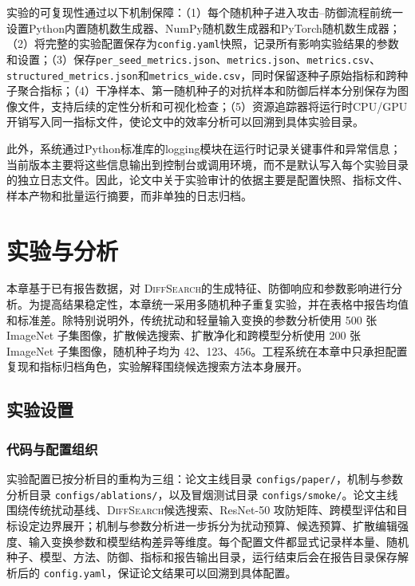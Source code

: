 \documentclass[type=bachelor,oneside]{fduthesis}
\newcommand{\methodname}{\textsc{DiffSearch}}
\begin{document}
实验的可复现性通过以下机制保障：（1）每个随机种子进入攻击--防御流程前统一设置Python内置随机数生成器、NumPy随机数生成器和PyTorch随机数生成器；（2）将完整的实验配置保存为\texttt{config.yaml}快照，记录所有影响实验结果的参数和设置；（3）保存\texttt{per\_seed\_metrics.json}、\texttt{metrics.json}、\texttt{metrics.csv}、\texttt{structured\_metrics.json}和\texttt{metrics\_wide.csv}，同时保留逐种子原始指标和跨种子聚合指标；（4）干净样本、第一随机种子的对抗样本和防御后样本分别保存为图像文件，支持后续的定性分析和可视化检查；（5）资源追踪器将运行时CPU/GPU开销写入同一指标文件，使论文中的效率分析可以回溯到具体实验目录。

此外，系统通过Python标准库的logging模块在运行时记录关键事件和异常信息；当前版本主要将这些信息输出到控制台或调用环境，而不是默认写入每个实验目录的独立日志文件。因此，论文中关于实验审计的依据主要是配置快照、指标文件、样本产物和批量运行摘要，而非单独的日志归档。

\chapter{实验与分析}
\label{chap:experiment}

本章基于已有报告数据，对 \methodname 的生成特征、防御响应和参数影响进行分析。为提高结果稳定性，本章统一采用多随机种子重复实验，并在表格中报告均值和标准差。除特别说明外，传统扰动和轻量输入变换的参数分析使用 500 张 ImageNet 子集图像，扩散候选搜索、扩散净化和跨模型分析使用 200 张 ImageNet 子集图像，随机种子均为 42、123、456。工程系统在本章中只承担配置复现和指标归档角色，实验解释围绕候选搜索方法本身展开。

\section{实验设置}

\subsection{代码与配置组织}

实验配置已按分析目的重构为三组：论文主线目录 \texttt{configs/\allowbreak paper/}，机制与参数分析目录 \texttt{configs/\allowbreak ablations/}，以及冒烟测试目录 \texttt{configs/\allowbreak smoke/}。论文主线围绕传统扰动基线、\methodname 候选搜索、ResNet-50 攻防矩阵、跨模型评估和目标设定边界展开；机制与参数分析进一步拆分为扰动预算、候选预算、扩散编辑强度、输入变换参数和模型结构差异等维度。每个配置文件都显式记录样本量、随机种子、模型、方法、防御、指标和报告输出目录，运行结束后会在报告目录保存解析后的 \texttt{config.yaml}，保证论文结果可以回溯到具体配置。
\end{document}
